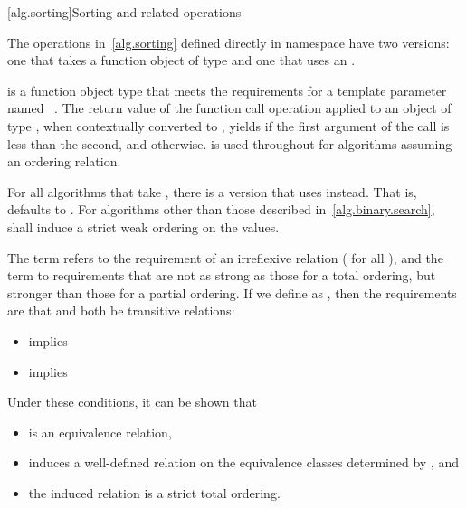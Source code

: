 [alg.sorting]{Sorting and related operations}

\pnum
The operations in~\ref{alg.sorting} defined directly in namespace 
have two versions:
one that takes a function object of type  and
one that uses an .

\pnum
{} is a function object type
that meets the requirements for a template parameter
named ~.
The return value of the function call operation
applied to an object of type ,
when contextually converted to ,
yields 
if the first argument of the call is less than the second, and
 otherwise.
 is used throughout
for algorithms assuming an ordering relation.

\pnum
For all algorithms that take ,
there is a version that uses  instead.
That is,  defaults to .
For algorithms other than those described in~\ref{alg.binary.search},
 shall induce a strict weak ordering on the values.

\pnum
The term  refers to the requirement
of an irreflexive relation ( for all ),
and the term  to requirements
that are not as strong as those for a total ordering,
but stronger than those for a partial ordering.
If we define  as ,
then the requirements are that  and 
both be transitive relations:

\begin{itemize}
\item {} implies 
\item {} implies 
\end{itemize}
\begin{note}
Under these conditions, it can be shown that
\begin{itemize}
\item
   is an equivalence relation,
\item
   induces a well-defined relation
  on the equivalence classes determined by , and
\item
  the induced relation is a strict total ordering.
\end{itemize}
\end{note}

